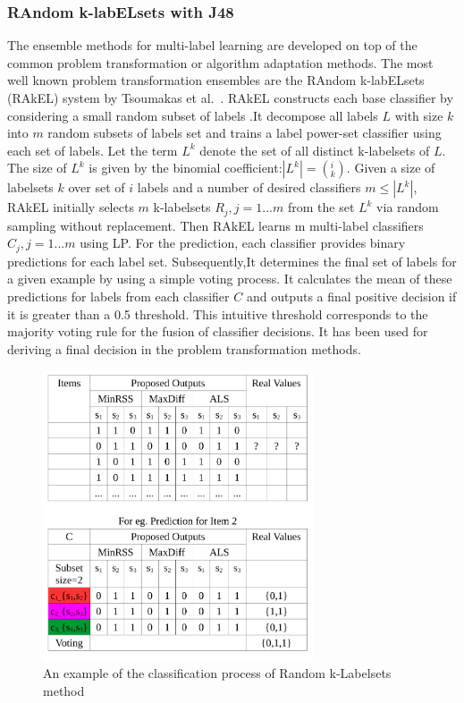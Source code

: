 \documentclass[12pt]{article}
\begin{document}
\subsubsection{RAndom k-labELsets with J48}
The ensemble methods for multi-label learning are developed on top of the common problem transformation or algorithm adaptation methods. The most well known problem transformation ensembles are the RAndom k-labELsets (RAkEL) system by Tsoumakas et al.~\cite{Tsoumakas2011random}. RAkEL constructs each base classifier by considering a small random subset of labels .It decompose all labels $L$  with size $k$ into $m$ random subsets of labels set and trains a label power-set classifier
using each set of labels. Let the term $L^k$ denote the set of all distinct k-labelsets of $L$.
The size of $L^k$ is given by the binomial coefficient:$|L^k| =(^i_k)$. Given a size of labelsets $k$ over set of $i$ labels and a number of desired classifiers $m ≤ |L^k|$, RAkEL initially selects $m$ k-labelsets $R_j , j = 1 . . . m$ from the set $L^k$ via random sampling without replacement.  Then RAkEL learns m multi-label classifiers $C_j , j = 1 . . . m$ using LP. For the prediction, each classifier provides binary predictions for each label set. Subsequently,It  determines the final set of labels for a given example by using a simple voting process. It calculates the mean of these predictions for labels 
from each classifier $C$ and outputs a final positive decision if it is greater than a 0.5 threshold. This intuitive threshold corresponds to the majority voting rule for the fusion of classifier decisions. It has been used for deriving a final decision in the problem transformation methods. 

\begin{figure}[h]
  \centering
    \includegraphics[width=8cm]{graph/RAKEL.pdf}
  \caption{An example of the classification process of Random k-Labelsets method}\label{fig:RAKEL}
\end{figure}
\end{document}
